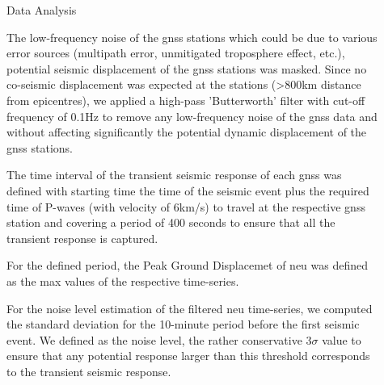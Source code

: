 \documentclass[final,a0,portrait]{beamer}
\newlength{\sepwid}
\newlength{\onecolwid}
\newlength{\twocolwid}
\begin{document}
\begin{frame}[t]
\begin{columns}[t]
\begin{column}{\onecolwid}
\end{column} %

\begin{column}{\sepwid}\end{column}

\begin{column}{\twocolwid} 


\begin{block}{Data Analysis}

{\small
The low-frequency noise of the gnss stations which could be due to various error sources (multipath error, unmitigated troposphere effect, etc.), potential seismic displacement of the gnss stations was masked. Since no co-seismic displacement was expected at the stations (>800km distance from epicentres), we applied a high-pass 'Butterworth' filter with cut-off frequency of 0.1Hz to remove any low-frequency noise of the gnss data and without affecting significantly the potential dynamic displacement of the gnss stations.

The time interval of the transient seismic response of each gnss was defined with starting time the time of the seismic event plus the required time of P-waves (with velocity of 6km/s) to travel at the respective gnss station and covering a period of 400 seconds to ensure that all the transient response is captured.

For the defined period, the Peak Ground Displacemet of neu was defined as the max values of the respective time-series.

For the noise level estimation of the filtered neu time-series, we computed the standard deviation for the 10-minute period before the first seismic event. We defined as the noise level, the rather conservative 3$\sigma$ value to ensure that any potential response larger than this threshold corresponds to the transient seismic response.
}



\end{block}
\end{column}
\end{columns}
\end{frame}
\end{document}
